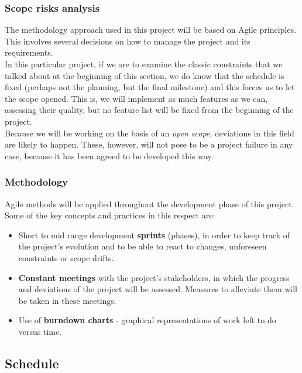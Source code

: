 \subsubsection{Scope risks analysis}

The methodology approach used in this project will be based on Agile principles. This involves several decisions on how to manage the project and its requirements.\\

In this particular project, if we are to examine the classic constraints that we talked about at the beginning of this section, we do know that the schedule is fixed (perhaps not the planning, but the final milestone) and this forces us to let the scope opened. This is, we will implement as much features as we can, assessing their quality, but no feature list will be fixed from the beginning of the project.\\

Because we will be working on the basis of an \textit{open scope}, deviations in this field are likely to happen. These, however, will not pose to be a project failure in any case, because it has been agreed to be developed this way.

\subsubsection{Methodology}

Agile methods will be applied throughout the development phase of this project. Some of the key concepts and practices in this respect are:

\begin{itemize}
	\item Short to mid range development \textbf{sprints} (phases), in order to keep track of the project’s evolution and to be able to react to changes, unforeseen constraints or scope drifts.
	\item \textbf{Constant meetings} with the project’s stakeholders, in which the progress and deviations of the project will be assessed. Measures to alleviate them will be taken in these meetings.
	\item Use of \textbf{burndown charts} - graphical representations of work left to do versus time.
\end{itemize}

\subsection{Schedule}

